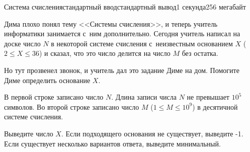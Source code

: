 \begin{problem}{Система счисления}{стандартный ввод}{стандартный вывод}{1 секунда}{256 мегабайт}

Дима плохо понял тему <<Системы счисления>>, и теперь учитель информатики занимается с~ним дополнительно. Сегодня учитель написал на доске число $N$ в некоторой системе счисления с~неизвестным основанием $X$ ($2 \leq X \leq 36$) и сказал, что это число делится на число $M$ без остатка. 

Но тут прозвенел звонок, и учитель дал это задание Диме на дом. Помогите Диме определить основание $X$.

\InputFile
В первой строке записано число $N$. Длина записи числа $N$ не превышает $10^5$ символов. Во второй строке записано число $M$ ($1 \leq M \leq 10^9$) в десятичной системе счисления.

\OutputFile
Выведите число $X$. Если подходящего основания не существует, выведите -1. Если существует несколько вариантов ответа, выведите минимальный.

\Examples

\begin{example}
%
%
\end{example}

\end{problem}

